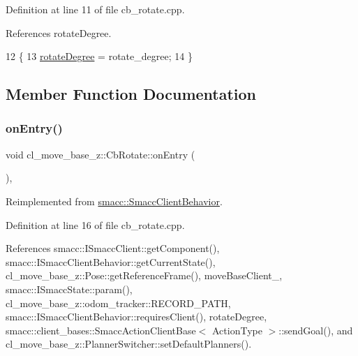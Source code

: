Definition at line 11 of file cb\+\_\+rotate.\+cpp.



References rotate\+Degree.


\begin{DoxyCode}
12 \{
13     \hyperlink{classcl__move__base__z_1_1CbRotate_a83e9f97e917044f919c98a55d8e00db6}{rotateDegree} = rotate\_degree;
14 \}
\end{DoxyCode}


\subsection{Member Function Documentation}
\mbox{\label{classcl__move__base__z_1_1CbRotate_a316ee51ecfd3f10fd1edae0d7d3b26c0}} 
\subsubsection{\texorpdfstring{on\+Entry()}{onEntry()}}
{\footnotesize\ttfamily void cl\+\_\+move\+\_\+base\+\_\+z\+::\+Cb\+Rotate\+::on\+Entry (\begin{DoxyParamCaption}{ }\end{DoxyParamCaption})\hspace{0.3cm}{\ttfamily [override]}, {\ttfamily [virtual]}}



Reimplemented from \hyperlink{classsmacc_1_1SmaccClientBehavior_ad5d3e1f1697c3cfe66c94cadba948493}{smacc\+::\+Smacc\+Client\+Behavior}.



Definition at line 16 of file cb\+\_\+rotate.\+cpp.



References smacc\+::\+I\+Smacc\+Client\+::get\+Component(), smacc\+::\+I\+Smacc\+Client\+Behavior\+::get\+Current\+State(), cl\+\_\+move\+\_\+base\+\_\+z\+::\+Pose\+::get\+Reference\+Frame(), move\+Base\+Client\+\_\+, smacc\+::\+I\+Smacc\+State\+::param(), cl\+\_\+move\+\_\+base\+\_\+z\+::odom\+\_\+tracker\+::\+R\+E\+C\+O\+R\+D\+\_\+\+P\+A\+TH, smacc\+::\+I\+Smacc\+Client\+Behavior\+::requires\+Client(), rotate\+Degree, smacc\+::client\+\_\+bases\+::\+Smacc\+Action\+Client\+Base$<$ Action\+Type $>$\+::send\+Goal(), and cl\+\_\+move\+\_\+base\+\_\+z\+::\+Planner\+Switcher\+::set\+Default\+Planners().


